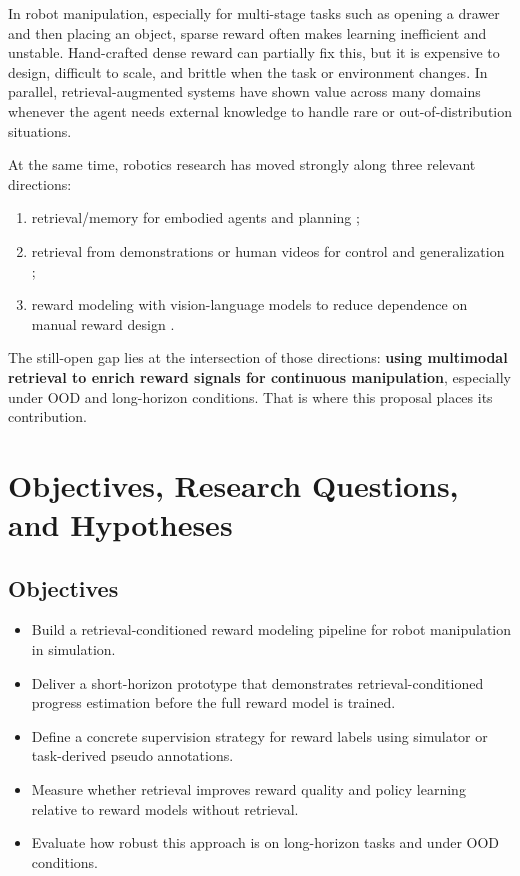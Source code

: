 In robot manipulation, especially for multi-stage tasks such as opening a drawer and then placing an object,
sparse reward often makes learning inefficient and unstable. Hand-crafted dense reward can partially fix this,
but it is expensive to design, difficult to scale, and brittle when the task or environment changes.
In parallel, retrieval-augmented systems have shown value across many domains whenever the agent needs
external knowledge to handle rare or out-of-distribution situations.

At the same time, robotics research has moved strongly along three relevant directions:
\begin{enumerate}
  \item retrieval/memory for embodied agents and planning \citep{liu2024embodiedrag, li2025embodiedrag, xu2024raea};
  \item retrieval from demonstrations or human videos for control and generalization \citep{johns2024dinobot, huang2025strap, jain2024vid2robot};
  \item reward modeling with vision-language models to reduce dependence on manual reward design \citep{ma2024vlmfeedback, yang2025rgvlm, song2026roboreward}.
\end{enumerate}

The still-open gap lies at the intersection of those directions:
\textbf{using multimodal retrieval to enrich reward signals for continuous manipulation},
especially under OOD and long-horizon conditions. That is where this proposal places its contribution.

\section{Objectives, Research Questions, and Hypotheses}

\subsection{Objectives}

\begin{itemize}
  \item Build a retrieval-conditioned reward modeling pipeline for robot manipulation in simulation.
  \item Deliver a short-horizon prototype that demonstrates retrieval-conditioned progress estimation before the full reward model is trained.
  \item Define a concrete supervision strategy for reward labels using simulator or task-derived pseudo annotations.
  \item Measure whether retrieval improves reward quality and policy learning relative to reward models without retrieval.
  \item Evaluate how robust this approach is on long-horizon tasks and under OOD conditions.
\end{itemize}

